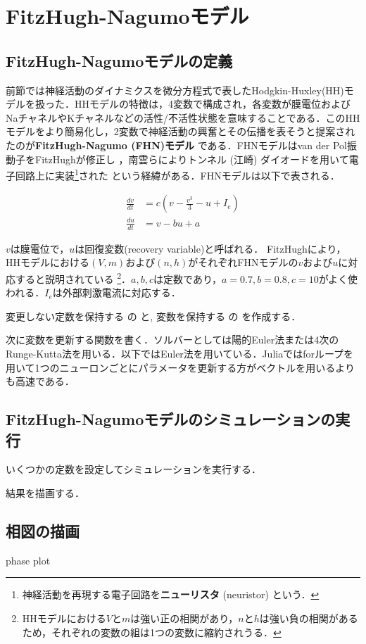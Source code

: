 \section{FitzHugh-Nagumoモデル}
\subsection{FitzHugh-Nagumoモデルの定義}

前節では神経活動のダイナミクスを微分方程式で表したHodgkin-Huxley(HH)モデルを扱った．HHモデルの特徴は，4変数で構成され，各変数が膜電位およびNaチャネルやKチャネルなどの活性/不活性状態を意味することである．このHHモデルをより簡易化し，2変数で神経活動の興奮とその伝播を表そうと提案されたのが\textbf{FitzHugh-Nagumo (FHN)モデル} である．FHNモデルはvan der Pol振動子をFitzHughが修正し\citep{FitzHugh1955-bx} \citep{Fitzhugh1961-fp}，南雲らによりトンネル (江崎) ダイオードを用いて電子回路上に実装\footnote{神経活動を再現する電子回路を\textbf{ニューリスタ}  (neuristor) という．}された \citep{Nagumo1962-ob}という経緯がある．FHNモデルは以下で表される．


\begin{align} 
\frac{dv}{dt} &= c\left(v-\frac{v^3}{3}-u+I_e\right)\\ 
\frac{du}{dt} &= v-bu+a 
\end{align}


$v$は膜電位で，$u$は回復変数(recovery variable)と呼ばれる． FitzHughにより，HHモデルにおける$(V, m)$および$(n, h)$がそれぞれFHNモデルの$v$および$u$に対応すると説明されている \citep{Fitzhugh1961-fp} \footnote{HHモデルにおける$V$と$m$は強い正の相関があり，$n$と$h$は強い負の相関があるため，それぞれの変数の組は1つの変数に縮約されうる．}．$a,b,c$は定数であり，$a=0.7, b=0.8, c=10$がよく使われる．$I_e$は外部刺激電流に対応する．

変更しない定数を保持する  の  と, 変数を保持する  の  を作成する．

次に変数を更新する関数を書く．ソルバーとしては陽的Euler法または4次のRunge-Kutta法を用いる．以下ではEuler法を用いている．Juliaではforループを用いて1つのニューロンごとにパラメータを更新する方がベクトルを用いるよりも高速である．

\subsection{FitzHugh-Nagumoモデルのシミュレーションの実行}
いくつかの定数を設定してシミュレーションを実行する．

結果を描画する．


\subsection{相図の描画}
phase plot



